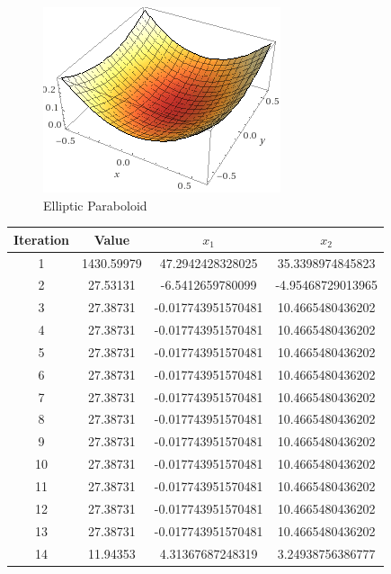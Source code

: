 \documentclass[oneside,12pt,openany]{book}
\begin{document}
     \begin{figure}[hbt!]
        \centering
        \includegraphics[width=.4\linewidth]{images/Parabola.png}
        \caption{Elliptic Paraboloid}
        \label{fig:Paraboloid}
    \end{figure}

    \FloatBarrier
    
    \begin{longtable}[c]{|c|c|c|c|}
        \hline
        \textbf{Iteration} & \textbf{Value} & \textbf{$x_{1}$} & \textbf{$x_{2}$} \\ \hline
        \endhead
        1 & 1430.59979 & 47.2942428328025 & 35.3398974845823 \\ \hline
        2 & 27.53131 & -6.5412659780099 & -4.95468729013965 \\ \hline
        3 & 27.38731 & -0.017743951570481 & 10.4665480436202 \\ \hline
        4 & 27.38731 & -0.017743951570481 & 10.4665480436202 \\ \hline
        5 & 27.38731 & -0.017743951570481 & 10.4665480436202 \\ \hline
        6 & 27.38731 & -0.017743951570481 & 10.4665480436202 \\ \hline
        7 & 27.38731 & -0.017743951570481 & 10.4665480436202 \\ \hline
        8 & 27.38731 & -0.017743951570481 & 10.4665480436202 \\ \hline
        9 & 27.38731 & -0.017743951570481 & 10.4665480436202 \\ \hline
        10 & 27.38731 & -0.017743951570481 & 10.4665480436202 \\ \hline
        11 & 27.38731 & -0.017743951570481 & 10.4665480436202 \\ \hline
        12 & 27.38731 & -0.017743951570481 & 10.4665480436202 \\ \hline
        13 & 27.38731 & -0.017743951570481 & 10.4665480436202 \\ \hline
        14 & 11.94353 & 4.31367687248319 & 3.24938756386777 \\ \hline

\end{longtable}
\end{document}
